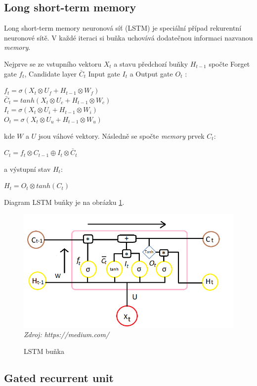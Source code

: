 \subsection{Long short-term memory}

Long short-term memory neuronová síť (LSTM) je speciální případ rekurentní neuronové sítě. V každé iteraci si buňka uchovává dodatečnou informaci nazvanou \textit{memory}. 

Nejprve se ze vstupního vektoru $X_{t}$ a stavu předchozí buňky $H_{t-1}$ spočte Forget gate $f_{t}$, Candidate layer $\bar{C}_{t}$ Input gate $I_{t}$ a Output gate $O_{t}$ \citep{cho.lstm}:

$f_{t}=\sigma(X_{t} \otimes U_{f}+H_{t-1} \otimes W_{f})$\\\indent
$\bar{C}_{t}=tanh(X_{t} \otimes U_{c}+H_{t-1} \otimes W_{c})$\\\indent
$I_{t}=\sigma(X_{t} \otimes U_{i}+H_{t-1} \otimes W_{i})$\\\indent
$O_{t}=\sigma(X_{t} \otimes U_{u}+H_{t-1} \otimes W_{u})$

\noindent kde $W$ a $U$ jsou váhové vektory. Následně se spočte \textit{memory} prvek $C_{t}$:

$C_{t}=f_{t} \otimes C_{t-1} \oplus I_{t} \otimes \bar{C}_{t}$

\noindent a výstupní stav $H_{t}$:

$H_{t}=O_{t} \otimes tanh(C_{t})$

Diagram LSTM buňky je na obrázku \ref{fig:lstm_cell}.

\begin{figure}[H]
\caption{LSTM buňka}
\label{fig:lstm_cell}
\centering
\includegraphics[width=1\textwidth]{img/cho/lstm_cell.png}
\textit{Zdroj: https://medium.com/}
\end{figure}

\subsection{Gated recurrent unit}

